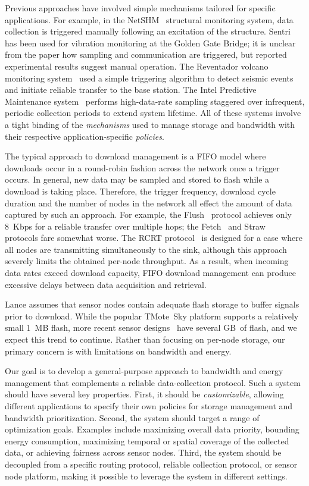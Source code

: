 \documentclass[lettersize]{sig-alternate-konrad}
\begin{document}
Previous approaches have involved simple mechanisms tailored for 
specific applications. For example, in the
NetSHM~\cite{netshm-spots06,netshm-emnets05} structural monitoring 
system, data collection is 
triggered manually following an excitation of the structure.
Sentri~\cite{ggb-ipsn07} has been used for vibration monitoring at
the Golden Gate Bridge; it is unclear from the paper how sampling and
communication are triggered, but reported experimental results
suggest manual operation. The Reventador volcano monitoring 
system~\cite{volcano-osdi06} used a simple triggering algorithm to detect 
seismic events and initiate reliable transfer to the base station. 
The Intel Predictive Maintenance
system~\cite{intel-northseasensys} performs high-data-rate sampling
staggered over infrequent, periodic collection periods to extend
system lifetime. 
All of these systems involve a tight binding of the {\em mechanisms} 
used to manage storage and bandwidth with their respective 
application-specific {\em policies}.

The typical approach to download management is a FIFO model where downloads
occur in a round-robin fashion across the network once a trigger occurs. In
general, new data may be sampled and stored to flash while a download is
taking place.  Therefore, the trigger frequency, download cycle duration and
the number of nodes in the network all effect the amount of data captured by
such an approach.  For example, the Flush~\cite{flush-sensys07} protocol
achieves only 8~Kbps for a reliable transfer over multiple hops; the
Fetch~\cite{volcano-osdi06} and Straw~\cite{ggb-ipsn07} protocols fare
somewhat worse. The RCRT protocol~\cite{rcrt-sensys07} is designed for a case
where all nodes are transmitting simultaneously to the sink, although this
approach severely limits the obtained per-node throughput. As a result, when
incoming data rates exceed download capacity, FIFO download management can
produce excessive delays between data acquisition and retrieval.

Lance assumes that sensor nodes contain adequate flash storage to buffer
signals prior to download.  While the popular TMote~Sky platform supports a
relatively small 1~MB flash, more recent sensor designs~\cite{shimmer} have
several GB~of flash, and we expect this trend to continue. Rather than
focusing on per-node storage, our primary concern is with limitations on
bandwidth and energy.

Our goal is to develop a general-purpose approach to bandwidth and energy
management that complements a reliable data-collection protocol. Such a
system should have several key properties.  First, it should be {\em
customizable}, allowing different applications to specify their own policies
for storage management and bandwidth prioritization. Second, the system
should target a range of optimization goals. Examples include maximizing
overall data priority, bounding energy consumption, maximizing temporal or
spatial coverage of the collected data, or achieving fairness across sensor
nodes. Third, the system should be decoupled from a specific routing
protocol, reliable collection protocol, or sensor node platform, making it
possible to leverage the system in different settings. 
\end{document}
